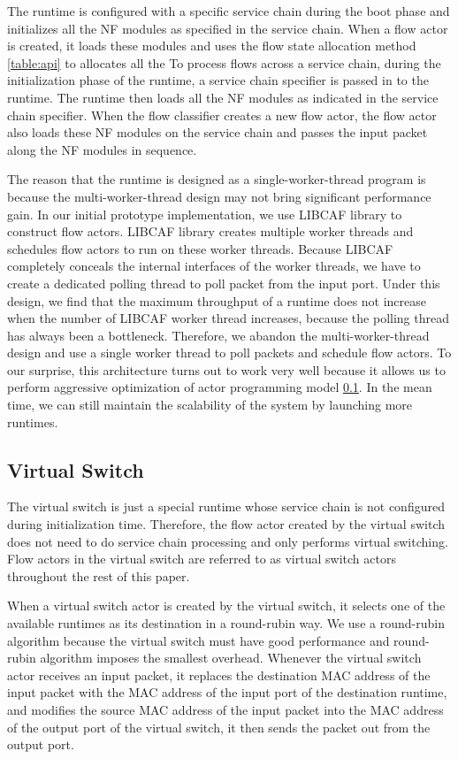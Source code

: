 The runtime is configured with a specific service chain during the boot phase and initializes all the NF modules as specified in the service chain. When a flow actor is created, it loads these modules and uses the flow state allocation method \ref{table:api} to allocates all the
To process flows across a service chain, during the initialization phase of the runtime, a service chain specifier is passed in to the runtime. The runtime then loads all the NF modules as indicated in the service chain specifier. When the flow classifier creates a new flow actor, the flow actor also loads these NF modules on the service chain and passes the input packet along the NF modules in sequence.

The reason that the runtime is designed as a single-worker-thread program is because the multi-worker-thread design may not bring significant performance gain. In our initial prototype implementation, we use LIBCAF \cite{caf} library to construct flow actors. LIBCAF library creates multiple worker threads and schedules flow actors to run on these worker threads. Because LIBCAF completely conceals the internal interfaces of the worker threads, we have to create a dedicated polling thread to poll packet from the input port. Under this design, we find that the maximum throughput of a runtime does not increase when the number of LIBCAF worker thread increases, because the polling thread has always been a bottleneck. Therefore, we abandon the multi-worker-thread design and use a single worker thread to poll packets and schedule flow actors. To our surprise, this architecture turns out to work very well because it allows us to perform aggressive optimization of actor programming model \ref{}. In the mean time, we can still maintain the scalability of the system by launching more runtimes.

\subsection{Virtual Switch}

The virtual switch is just a special runtime whose service chain is not configured during initialization time. Therefore, the flow actor created by the virtual switch does not need to do service chain processing and only performs virtual switching. Flow actors in the virtual switch are referred to as virtual switch actors throughout the rest of this paper.

When a virtual switch actor is created by the virtual switch, it selects one of the available runtimes as its destination in a round-rubin way. We use a round-rubin algorithm because the virtual switch must have good performance and round-rubin algorithm imposes the smallest overhead. Whenever the virtual switch actor receives an input packet, it replaces the destination MAC address of the input packet with the MAC address of the input port of the destination runtime, and modifies the source MAC address of the input packet into the MAC address of the output port of the virtual switch, it then sends the packet out from the output port.


